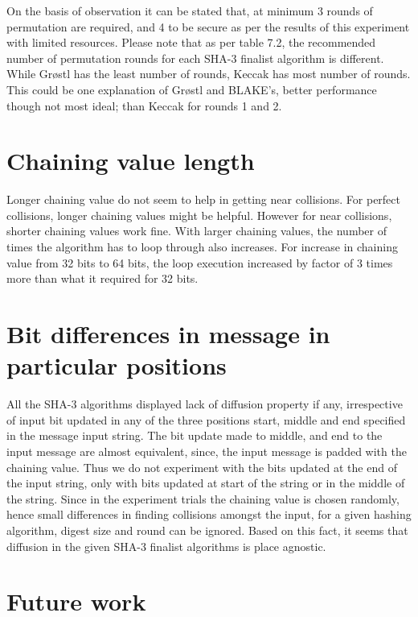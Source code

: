 On the basis of observation it can be stated that, at minimum 3 rounds of permutation are required, and 4 to 
be secure as per the results of this experiment with limited resources. Please note that as per table 7.2,
the recommended number of permutation rounds for each SHA-3 finalist algorithm is different. While Gr{\o}stl
has the least number of rounds, Keccak has most number of rounds. This could be one explanation of Gr{\o}stl
and BLAKE's, better performance though not most ideal; than Keccak for rounds 1 and 2.

\section{Chaining value length}

Longer chaining value do not seem to help in getting near collisions. For perfect collisions, longer chaining values
might be helpful. However for near collisions, shorter chaining values work fine. With larger chaining values,
the number of times the algorithm has to loop through also increases. For increase in chaining value from 32 bits
to 64 bits, the loop execution increased by factor of 3 times more than what it required for 32 bits.

\section{Bit differences in message in particular positions}

All the SHA-3 algorithms displayed lack of diffusion property if any, irrespective of input bit updated in any
of the three positions start, middle and end specified in the message input string. The bit update made to middle,
and end to the input message are almost equivalent, since, the input message is padded with the chaining value. 
Thus we do not experiment with the bits updated at the end of the input string, only with bits updated at start
of the string or in the middle of the string. Since in the experiment trials the chaining value is chosen randomly,
hence small differences in finding collisions amongst the input, for a given hashing algorithm, digest size and round
can be ignored. Based on this fact, it seems that diffusion in the given SHA-3 finalist algorithms is place agnostic. 

\section{Future work}

